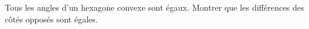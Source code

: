 Tous les angles d'un hexagone convexe sont égaux. Montrer que les différences des côtés opposés sont égales.

